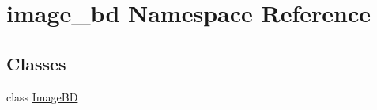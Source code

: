 \hypertarget{namespaceimage__bd}{}\section{image\+\_\+bd Namespace Reference}
\label{namespaceimage__bd}
\subsection*{Classes}
\begin{DoxyCompactItemize}
\item 
class \hyperlink{classimage__bd_1_1_image_b_d}{Image\+BD}
\end{DoxyCompactItemize}
